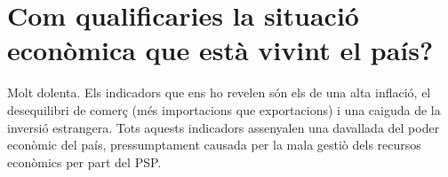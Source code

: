\section{Com qualificaries la situació econòmica que està vivint el país?}

Molt dolenta. Els indicadors que ens ho revelen són els de una alta 
inflació, el desequilibri de comerç (més importacions que exportacions) i
una caiguda de la inversió estrangera. Tots aquests indicadors assenyalen
una davallada del poder econòmic del país, pressumptament causada per la
mala gestiò dels recursos econòmics per part del PSP.


